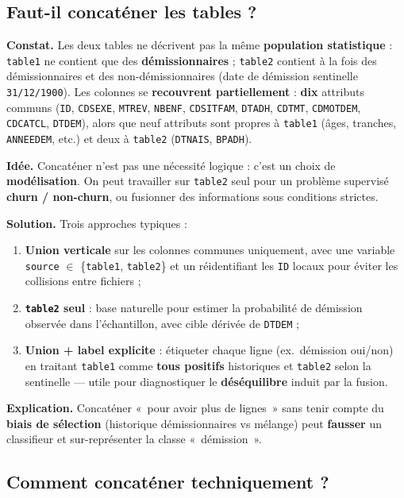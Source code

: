 \documentclass[11pt,a4paper]{article}
\begin{document}
\subsection{Faut-il concaténer les tables ?}

\textbf{Constat.} Les deux tables ne décrivent pas la même \textbf{population statistique} : \texttt{table1} ne contient que des \textbf{démissionnaires} ; \texttt{table2} contient à la fois des démissionnaires et des non-démissionnaires (date de démission sentinelle \texttt{31/12/1900}). Les colonnes se \textbf{recouvrent partiellement} : \textbf{dix} attributs communs (\texttt{ID}, \texttt{CDSEXE}, \texttt{MTREV}, \texttt{NBENF}, \texttt{CDSITFAM}, \texttt{DTADH}, \texttt{CDTMT}, \texttt{CDMOTDEM}, \texttt{CDCATCL}, \texttt{DTDEM}), alors que neuf attributs sont propres à \texttt{table1} (âges, tranches, \texttt{ANNEEDEM}, etc.) et deux à \texttt{table2} (\texttt{DTNAIS}, \texttt{BPADH}).

\textbf{Idée.} Concaténer n'est pas une nécessité logique : c'est un choix de \textbf{modélisation}. On peut travailler sur \texttt{table2} seul pour un problème supervisé \textbf{churn / non-churn}, ou fusionner des informations sous conditions strictes.

\textbf{Solution.} Trois approches typiques :
\begin{enumerate}[leftmargin=*]
  \item \textbf{Union verticale} sur les colonnes communes uniquement, avec une variable \texttt{source} $\in$ \{\texttt{table1}, \texttt{table2}\} et un réidentifiant les \texttt{ID} locaux pour éviter les collisions entre fichiers ;
  \item \textbf{\texttt{table2} seul} : base naturelle pour estimer la probabilité de démission observée dans l'échantillon, avec cible dérivée de \texttt{DTDEM} ;
  \item \textbf{Union + label explicite} : étiqueter chaque ligne (ex.\ démission oui/non) en traitant \texttt{table1} comme \textbf{tous positifs} historiques et \texttt{table2} selon la sentinelle --- utile pour diagnostiquer le \textbf{déséquilibre} induit par la fusion.
\end{enumerate}

\textbf{Explication.} Concaténer «~pour avoir plus de lignes~» sans tenir compte du \textbf{biais de sélection} (historique démissionnaires vs mélange) peut \textbf{fausser} un classifieur et sur-représenter la classe «~démission~».

\subsection{Comment concaténer techniquement ?}
\label{sec:concat-tech}
\end{document}
